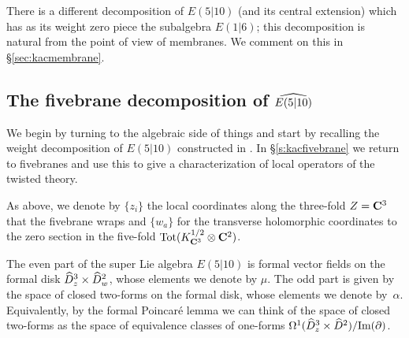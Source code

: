 There is a different decomposition of $E(5|10)$ (and its central extension) which has as its weight zero piece the subalgebra $E(1|6)$; this decomposition is natural from the point of view of membranes.
We comment on this in \S \ref{sec:kacmembrane}.

\subsection{The fivebrane decomposition of $\Hat{E(5|10)}$}


We begin by turning to the algebraic side of things and start by recalling the weight decomposition of $E(5|10)$ constructed in \cite{KR2}.
In \S \ref{s:kacfivebrane} we return to fivebranes and use this to give a  characterization of local operators of the twisted theory.

\parsec[s:e510weight]

As above, we denote by $\{z_i\}$ the local coordinates along the three-fold $Z=\C^3$ that the fivebrane wraps and $\{w_a\}$ for the transverse holomorphic coordinates to the zero section in the five-fold ${\rm Tot}(K_{\C^3}^{1/2} \otimes \C^2)$.

The even part of the super Lie algebra $E(5|10)$ is formal vector fields on the formal disk $\Hat{D}^3_z \times \Hat{D}^2_w$, whose elements we denote by $\mu$. 
The odd part is given by the space of closed two-forms on the formal disk, whose elements we denote by~$\alpha$.
Equivalently, by the formal Poincar\'e lemma we can think of the space of closed two-forms as the space of equivalence classes of one-forms $\Omega^1(\Hat{D}^3_z \times \Hat{D}^2) / \text{Im}(\del)$. 

